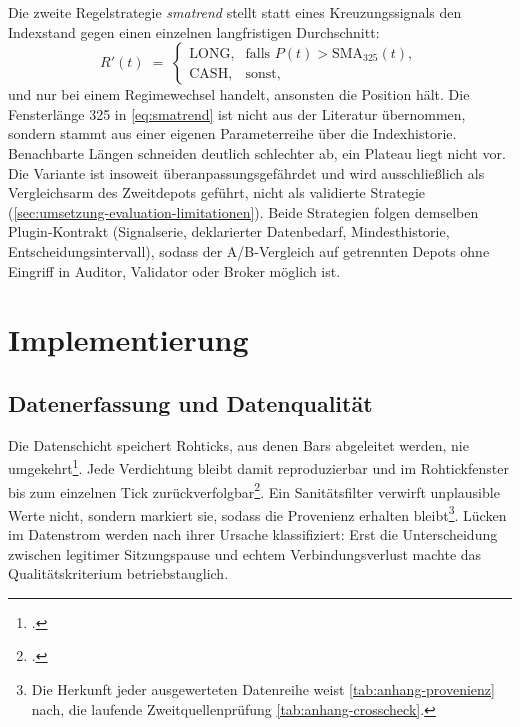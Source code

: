 Die zweite Regelstrategie \emph{smatrend} stellt statt eines Kreuzungssignals den
Indexstand gegen einen einzelnen langfristigen Durchschnitt:
\begin{equation}
  R'(t) \;=\;
  \begin{cases}
    \text{LONG}, & \text{falls } P(t) > \mathrm{SMA}_{325}(t),\\
    \text{CASH}, & \text{sonst,}
  \end{cases}
  \label{eq:smatrend}
\end{equation}
und nur bei einem Regimewechsel handelt, ansonsten die Position hält. Die Fensterlänge 325 in \cref{eq:smatrend}
ist nicht aus der Literatur übernommen, sondern stammt aus einer eigenen Parameterreihe über
die Indexhistorie. Benachbarte Längen schneiden deutlich schlechter ab, ein Plateau liegt
nicht vor. Die Variante ist insoweit überanpassungsgefährdet und wird ausschließlich als
Vergleichsarm des Zweitdepots geführt, nicht als validierte Strategie
(\cref{sec:umsetzung-evaluation-limitationen}).
Beide Strategien folgen demselben Plugin-Kontrakt (Signalserie, deklarierter Datenbedarf,
Mindesthistorie, Entscheidungsintervall), sodass der A/B-Vergleich auf getrennten
Depots ohne Eingriff in Auditor, Validator oder Broker möglich ist.

\section{Implementierung}
\label{sec:umsetzung-implementierung}

\subsection{Datenerfassung und Datenqualität}
\label{sec:umsetzung-impl-daten}

Die Datenschicht speichert Rohticks, aus denen Bars abgeleitet werden, nie
umgekehrt\footcite[vgl.][Kap.~2]{lopezdeprado2018}. Jede
Verdichtung bleibt damit reproduzierbar und im Rohtickfenster bis zum einzelnen Tick
zurückverfolgbar\footcites[vgl.][S.~357--362]{harris2020}[vgl.][S.~56--61]{mckinney2010}. Ein
Sanitätsfilter verwirft unplausible Werte nicht, sondern markiert sie, sodass die Provenienz
erhalten bleibt\footnote{Die Herkunft jeder ausgewerteten Datenreihe weist
\cref{tab:anhang-provenienz} nach, die laufende Zweitquellenprüfung
\cref{tab:anhang-crosscheck}.}. Lücken im Datenstrom werden nach ihrer Ursache klassifiziert: Erst die
Unterscheidung zwischen legitimer Sitzungspause und echtem Verbindungsverlust machte das
Qualitätskriterium betriebstauglich.

